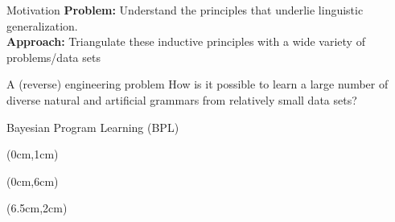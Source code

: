 \documentclass{beamer}
\begin{document}

  

\begin{frame}{Motivation}
  \Large \textbf{Problem:} Understand the principles that underlie linguistic generalization.\\\vspace{1cm} \textbf{Approach:} Triangulate these inductive principles with a wide variety of problems/data sets
\end{frame}

\begin{frame}{A (reverse) engineering problem}
  \Huge How is it possible 
  to learn a large number of diverse natural and artificial grammars from 
  relatively small data sets?
\end{frame}

\begin{frame}[t]{Bayesian Program Learning (BPL)}
\begin{textblock*}{5cm}(0cm,1cm)
    \end{textblock*}
\begin{textblock*}{6cm}(0cm,6cm)
    \end{textblock*}
\begin{textblock*}{6cm}(6.5cm,2cm)
    \end{textblock*}
\end{frame}
\end{document}
